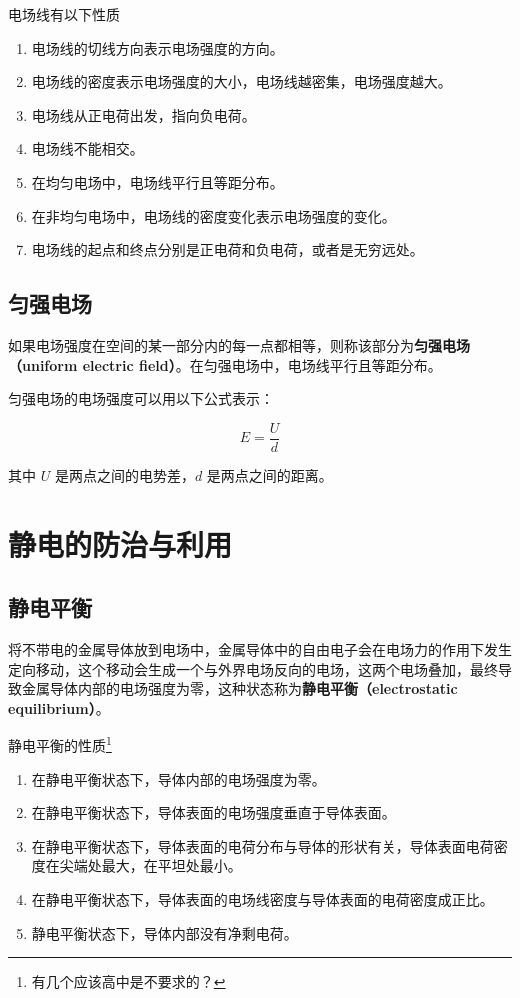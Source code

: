 \documentclass[lang=cn,newtx,10pt,scheme=chinese]{elegantbook}
\begin{document}
电场线有以下性质

\begin{enumerate}
  \item 电场线的切线方向表示电场强度的方向。
  \item 电场线的密度表示电场强度的大小，电场线越密集，电场强度越大。
  \item 电场线从正电荷出发，指向负电荷。
  \item 电场线不能相交。
  \item 在均匀电场中，电场线平行且等距分布。
  \item 在非均匀电场中，电场线的密度变化表示电场强度的变化。
  \item 电场线的起点和终点分别是正电荷和负电荷，或者是无穷远处。
\end{enumerate}

\subsection{匀强电场}

\begin{definition}
  如果电场强度在空间的某一部分内的每一点都相等，则称该部分为\textbf{匀强电场（uniform electric field）}。在匀强电场中，电场线平行且等距分布。

  匀强电场的电场强度可以用以下公式表示：

  $$
  E = \frac{U}{d}
  $$

  其中 $U$ 是两点之间的电势差，$d$ 是两点之间的距离。
\end{definition}

\section{静电的防治与利用}

\subsection{静电平衡}

\begin{definition}
  将不带电的金属导体放到电场中，金属导体中的自由电子会在电场力的作用下发生定向移动，这个移动会生成一个与外界电场反向的电场，这两个电场叠加，最终导致金属导体内部的电场强度为零，这种状态称为\textbf{静电平衡（electrostatic equilibrium）}。
\end{definition}

静电平衡的性质\footnote{有几个应该高中是不要求的？}

\begin{enumerate}
  \item 在静电平衡状态下，导体内部的电场强度为零。
  \item 在静电平衡状态下，导体表面的电场强度垂直于导体表面。
  \item 在静电平衡状态下，导体表面的电荷分布与导体的形状有关，导体表面电荷密度在尖端处最大，在平坦处最小。
  \item 在静电平衡状态下，导体表面的电场线密度与导体表面的电荷密度成正比。
  \item 静电平衡状态下，导体内部没有净剩电荷。
\end{enumerate}
\end{document}
